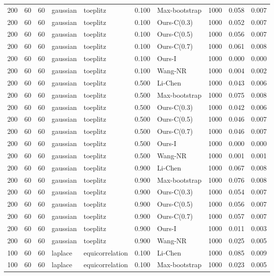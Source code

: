 \begin{tabular}{rrrllrlrrr}
200 & 60 & 60 & gaussian & toeplitz & 0.100 & Max-bootstrap & 1000 & 0.058 & 0.007 \\
200 & 60 & 60 & gaussian & toeplitz & 0.100 & Ours-C(0.3) & 1000 & 0.052 & 0.007 \\
200 & 60 & 60 & gaussian & toeplitz & 0.100 & Ours-C(0.5) & 1000 & 0.056 & 0.007 \\
200 & 60 & 60 & gaussian & toeplitz & 0.100 & Ours-C(0.7) & 1000 & 0.061 & 0.008 \\
200 & 60 & 60 & gaussian & toeplitz & 0.100 & Ours-I & 1000 & 0.000 & 0.000 \\
200 & 60 & 60 & gaussian & toeplitz & 0.100 & Wang-NR & 1000 & 0.004 & 0.002 \\
200 & 60 & 60 & gaussian & toeplitz & 0.500 & Li-Chen & 1000 & 0.043 & 0.006 \\
200 & 60 & 60 & gaussian & toeplitz & 0.500 & Max-bootstrap & 1000 & 0.075 & 0.008 \\
200 & 60 & 60 & gaussian & toeplitz & 0.500 & Ours-C(0.3) & 1000 & 0.042 & 0.006 \\
200 & 60 & 60 & gaussian & toeplitz & 0.500 & Ours-C(0.5) & 1000 & 0.046 & 0.007 \\
200 & 60 & 60 & gaussian & toeplitz & 0.500 & Ours-C(0.7) & 1000 & 0.046 & 0.007 \\
200 & 60 & 60 & gaussian & toeplitz & 0.500 & Ours-I & 1000 & 0.000 & 0.000 \\
200 & 60 & 60 & gaussian & toeplitz & 0.500 & Wang-NR & 1000 & 0.001 & 0.001 \\
200 & 60 & 60 & gaussian & toeplitz & 0.900 & Li-Chen & 1000 & 0.067 & 0.008 \\
200 & 60 & 60 & gaussian & toeplitz & 0.900 & Max-bootstrap & 1000 & 0.076 & 0.008 \\
200 & 60 & 60 & gaussian & toeplitz & 0.900 & Ours-C(0.3) & 1000 & 0.054 & 0.007 \\
200 & 60 & 60 & gaussian & toeplitz & 0.900 & Ours-C(0.5) & 1000 & 0.056 & 0.007 \\
200 & 60 & 60 & gaussian & toeplitz & 0.900 & Ours-C(0.7) & 1000 & 0.057 & 0.007 \\
200 & 60 & 60 & gaussian & toeplitz & 0.900 & Ours-I & 1000 & 0.011 & 0.003 \\
200 & 60 & 60 & gaussian & toeplitz & 0.900 & Wang-NR & 1000 & 0.025 & 0.005 \\
100 & 60 & 60 & laplace & equicorrelation & 0.100 & Li-Chen & 1000 & 0.085 & 0.009 \\
100 & 60 & 60 & laplace & equicorrelation & 0.100 & Max-bootstrap & 1000 & 0.023 & 0.005 \\

\end{tabular}

